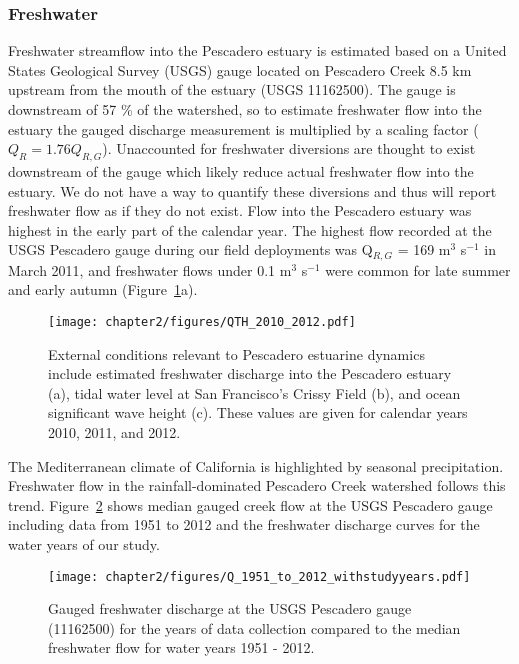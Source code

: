 \subsubsection{Freshwater}
Freshwater streamflow into the Pescadero estuary is estimated based on a United States Geological Survey (USGS) gauge located on Pescadero Creek 8.5 km upstream from the mouth of the estuary (USGS 11162500). The gauge is downstream of 57 \% of the watershed, so to estimate freshwater flow into the estuary the gauged discharge measurement is multiplied by a scaling factor ($Q_R = 1.76Q_{R,G}$). Unaccounted for freshwater diversions are thought to exist downstream of the gauge which likely reduce actual freshwater flow into the estuary. We do not have a way to quantify these diversions and thus will report freshwater flow as if they do not exist. Flow into the Pescadero estuary was highest in the early part of the calendar year. The highest flow recorded at the USGS Pescadero gauge during our field deployments was Q$_{R,G}$ = 169 m$^{3}$ s$^{-1}$ in March 2011, and freshwater flows under 0.1 m$^{3}$ s$^{-1}$ were common for late summer and early autumn (Figure~\ref{fig:QTH_2010_2012}a).


\begin{figure}[hp]
	\begin{center}
		\texttt{[image: chapter2/figures/QTH\_2010\_2012.pdf]} \caption{External conditions relevant to Pescadero estuarine dynamics include estimated freshwater discharge into the Pescadero estuary (a), tidal water level at San Francisco's Crissy Field (b), and ocean significant wave height (c). These values are given for calendar years 2010, 2011, and 2012.}\label{fig:QTH_2010_2012}  
	\end{center}
\end{figure}


The Mediterranean climate of California is highlighted by seasonal precipitation. Freshwater flow in the rainfall-dominated Pescadero Creek watershed follows this trend. Figure~\ref{fig:Q_1951_2012} shows median gauged creek flow at the USGS Pescadero gauge including data from 1951 to 2012 and the freshwater discharge curves for the water years of our study. 

\begin{figure}[p]
	\begin{center}
		\texttt{[image: chapter2/figures/Q\_1951\_to\_2012\_withstudyyears.pdf]} \caption{Gauged freshwater discharge at the USGS Pescadero gauge (11162500) for the years of data collection compared to the median freshwater flow for water years 1951 - 2012.}\label{fig:Q_1951_2012}
	\end{center}
\end{figure}


